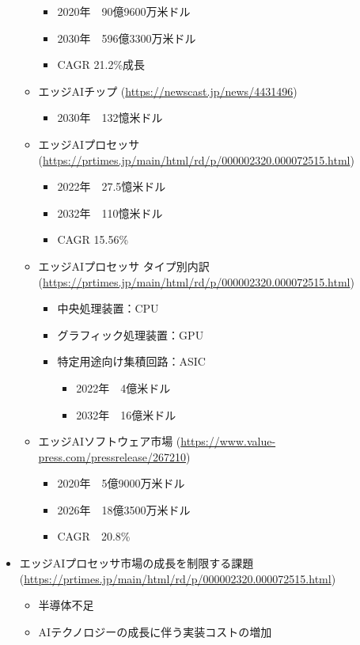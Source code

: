 \begin{itemize}
\begin{itemize}
		\begin{itemize}
			\item 2020年　90億9600万米ドル
			\item 2030年　596億3300万米ドル
			\item CAGR 21.2\%成長
		\end{itemize}
		\item エッジAIチップ (\url{https://newscast.jp/news/4431496})
		\begin{itemize}
			\item 2030年　132憶米ドル
		\end{itemize}
		\item エッジAIプロセッサ (\url{https://prtimes.jp/main/html/rd/p/000002320.000072515.html})
		\begin{itemize}
			\item 2022年　27.5憶米ドル
			\item 2032年　110憶米ドル
			\item CAGR 15.56\%
		\end{itemize}
		\item エッジAIプロセッサ タイプ別内訳 (\url{https://prtimes.jp/main/html/rd/p/000002320.000072515.html})
		\begin{itemize}
			\item 中央処理装置：CPU
			\item グラフィック処理装置：GPU
			\item 特定用途向け集積回路：ASIC
			\begin{itemize}
				\item 2022年　4億米ドル
				\item 2032年　16億米ドル
			\end{itemize}
		\end{itemize}
		\item エッジAIソフトウェア市場 (\url{https://www.value-press.com/pressrelease/267210})
		\begin{itemize}
			\item 2020年　5億9000万米ドル
			\item 2026年　18億3500万米ドル
			\item CAGR　20.8\%
		\end{itemize}
	\end{itemize}
	\item エッジAIプロセッサ市場の成長を制限する課題 (\url{https://prtimes.jp/main/html/rd/p/000002320.000072515.html})
	\begin{itemize}
		\item 半導体不足
		\item AIテクノロジーの成長に伴う実装コストの増加

\end{itemize}
\end{itemize}
